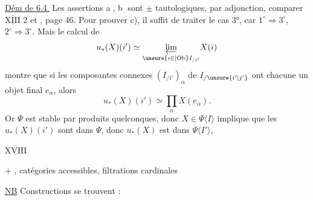 \uline{Dém de 6.4.} Les assertions \textcircled{a}, \textcircled{b}
sont $\pm$ tautologiques, par adjonction,
comparer $\overline{\underline{\mathrm{XIII}}}$  2 et , page 46.
Pour prouver c), il suffit de traiter le
cas 3°, car  $1^\circ\Rightarrow3^\circ$, $2^\circ\Rightarrow3^\circ$.
Mais le calcul de 
\[
u_*(X)(i')\simeq\underset{\unsure{i\in|\mathrm{Ob}} I_{/i'}}{\underleftarrow{\lim}}X(i)
\]
montre que si les composantes
connexes $(I_{/i'})_\alpha$ de $I_{/\unsure{i'|j'}}$ ont
chacune un objet final $e_\alpha$, alors
\[
u_*(X)(i')\simeq\prod_\alpha X(e_\alpha).
\]
Or $\Psi$  est stable par produits quelconques,
donc $X\in\Psi\langle I\rangle$ implique que
 les $u_*(X)(i')$ sont dans $\Psi$, donc
$u_*(X)$ est dans $\Psi\langle I'\rangle$, 

$\overline{\underline{\mathrm{XVIII}}}$


+ , catégories accessibles, filtrations cardinales

\uline{NB} Constructions  se trouvent :

